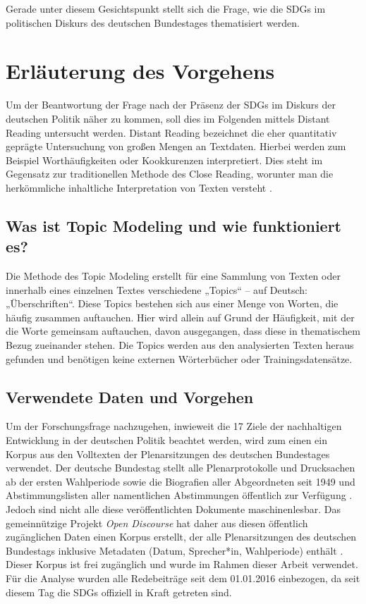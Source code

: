 \documentclass[a4paper,11pt]{article}
\begin{document}
Gerade unter diesem Gesichtspunkt stellt sich die Frage, wie die SDGs im
politischen Diskurs des deutschen Bundestages thematisiert werden.
 
\section{Erläuterung des Vorgehens}
Um der Beantwortung der Frage nach der Präsenz der SDGs im Diskurs der
deutschen Politik näher zu kommen, soll dies im Folgenden mittels Distant
Reading untersucht werden. Distant Reading bezeichnet die eher quantitativ
geprägte Untersuchung von großen Mengen an Textdaten. Hierbei werden zum
Beispiel Worthäufigkeiten oder Kookkurenzen interpretiert. Dies steht im
Gegensatz zur traditionellen Methode des Close Reading, worunter man die
herkömmliche inhaltliche Interpretation von Texten versteht \cite{Moretti}.

\subsection{Was ist Topic Modeling und wie funktioniert es?}
Die Methode des Topic Modeling erstellt für eine Sammlung von Texten oder
innerhalb eines einzelnen Textes verschiedene „Topics“ -- auf Deutsch:
„Überschriften“. Diese Topics bestehen sich aus einer Menge von Worten, die
häufig zusammen auftauchen. Hier wird allein auf Grund der Häufigkeit, mit der
die Worte gemeinsam auftauchen, davon ausgegangen, dass diese in thematischem
Bezug zueinander stehen. Die Topics werden aus den analysierten Texten heraus
gefunden und benötigen keine externen Wörterbücher oder Trainingsdatensätze.

\subsection{Verwendete Daten und Vorgehen}
Um der Forschungsfrage nachzugehen, inwieweit die 17 Ziele der nachhaltigen
Entwicklung in der deutschen Politik beachtet werden, wird zum einen ein
Korpus aus den Volltexten der Plenarsitzungen des deutschen Bundestages
verwendet. Der deutsche Bundestag stellt alle Ple\-nar\-protokolle und
Drucksachen ab der ersten Wahlperiode sowie die Biografien aller Abgeordneten
seit 1949 und Abstimmungslisten aller namentlichen Abstimmungen öffentlich zur
Verfügung \cite{Bundestag}. Jedoch sind nicht alle diese veröffentlichten
Dokumente maschinenlesbar. Das gemeinnützige Projekt \emph{Open Discourse} hat
daher aus diesen öffentlich zugänglichen Daten einen Korpus erstellt, der alle
Plenarsitzungen des deutschen Bundestags inklusive Metadaten (Datum,
Sprecher*in, Wahlperiode) enthält \cite{OpenDiscourse}. Dieser Korpus ist frei
zugänglich und wurde im Rahmen dieser Arbeit verwendet. Für die Analyse wurden
alle Redebeiträge seit dem 01.01.2016 einbezogen, da seit diesem Tag die SDGs
offiziell in Kraft getreten sind.
\end{document}
